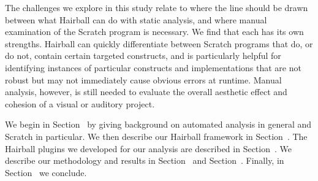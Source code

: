 The challenges we explore in this study relate to where the line
should be drawn between what Hairball can do with static analysis, and
where manual examination of the Scratch program is necessary.  We find
that each has its own strengths.  Hairball can quickly differentiate
between Scratch programs that do, or do not, contain certain targeted
constructs, and is particularly helpful for identifying instances of
particular constructs and implementations that are not robust but may
not immediately cause obvious errors at runtime.  Manual analysis,
however, is still needed to evaluate the overall aesthetic effect and
cohesion of a visual or auditory project.

We begin in Section~ by giving background on automated
analysis in general and Scratch in particular. We then describe our Hairball
framework in Section~. The Hairball plugins we
developed for our analysis are described in Section~. We
describe our methodology and results in Section~ and
Section~. Finally, in Section~ we
conclude.
